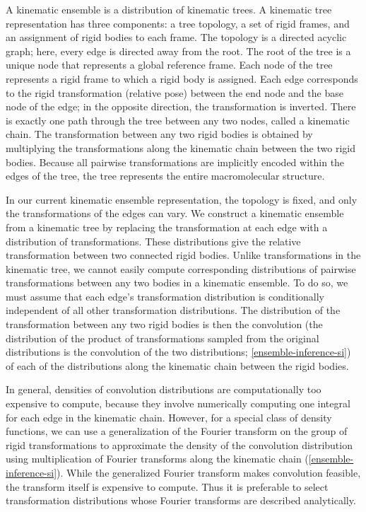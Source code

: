 \documentclass[../../main.tex]{subfiles}
\begin{document}
\begin{refsection}

	A kinematic ensemble is a distribution of kinematic trees.
	A kinematic tree representation has three components: a tree topology, a set of rigid frames, and an assignment of rigid bodies to each frame.
	The topology is a directed acyclic graph; here, every edge is directed away from the root.
	The root of the tree is a unique node that represents a global reference frame.
	Each node of the tree represents a rigid frame to which a rigid body is assigned.
	Each edge corresponds to the rigid transformation (relative pose) between the end node and the base node of the edge; in the opposite direction, the transformation is inverted.
	There is exactly one path through the tree between any two nodes, called a kinematic chain.
	The transformation between any two rigid bodies is obtained by multiplying the transformations along the kinematic chain between the two rigid bodies.
	Because all pairwise transformations are implicitly encoded within the edges of the tree, the tree represents the entire macromolecular structure.

	In our current kinematic ensemble representation, the topology is fixed, and only the transformations of the edges can vary.
	We construct a kinematic ensemble from a kinematic tree by replacing the transformation at each edge with a distribution of transformations.
	These distributions give the relative transformation between two connected rigid bodies.
	Unlike transformations in the kinematic tree, we cannot easily compute corresponding distributions of pairwise transformations between any two bodies in a kinematic ensemble.
	To do so, we must assume that each edge's transformation distribution is conditionally independent of all other transformation distributions.
	The distribution of the transformation between any two rigid bodies is then the convolution (\ie the distribution of the product of transformations sampled from the original distributions is the convolution of the two distributions; \cref{ensemble-inference-si}) of each of the distributions along the kinematic chain between the rigid bodies.


	In general, densities of convolution distributions are computationally too expensive to compute, because they involve numerically computing one integral for each edge in the kinematic chain.
	However, for a special class of density functions, we can use a generalization of the Fourier transform on the group of rigid transformations\supercite{millerApplicationsRepresentationTheory1964,chirikjianHarmonicAnalysisEngineers2016} to approximate the density of the convolution distribution using multiplication of Fourier transforms along the kinematic chain (\cref{ensemble-inference-si}).
	While the generalized Fourier transform makes convolution feasible, the transform itself is expensive to compute\supercite{kyatkinAlgorithmsFastConvolutions2000}.
	Thus it is preferable to select transformation distributions whose Fourier transforms are described analytically.


\end{refsection}
\end{document}
